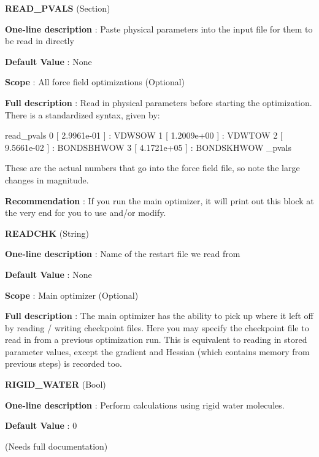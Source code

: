 \begin{DoxyItemize}
\item {\bfseries  \-R\-E\-A\-D\-\_\-\-P\-V\-A\-L\-S } (\-Section) \par
{\bfseries  \-One-\/line description }\-: \-Paste physical parameters into the input file for them to be read in directly \par
{\bfseries  \-Default \-Value }\-: \-None \par
{\bfseries  \-Scope }\-: \-All force field optimizations (\-Optional) \par
{\bfseries  \-Full description }\-: \-Read in physical parameters before starting the optimization. \-There is a standardized syntax, given by\-: \begin{DoxyVerb}read_pvals
 0 [  2.9961e-01 ] : VDWSOW
 1 [  1.2009e+00 ] : VDWTOW
 2 [  9.5661e-02 ] : BONDSBHWOW
 3 [  4.1721e+05 ] : BONDSKHWOW
 \read_pvals \end{DoxyVerb}
 \-These are the actual numbers that go into the force field file, so note the large changes in magnitude. \par
{\bfseries  \-Recommendation }\-: \-If you run the main optimizer, it will print out this block at the very end for you to use and/or modify.\end{DoxyItemize}
\begin{DoxyItemize}
\item {\bfseries  \-R\-E\-A\-D\-C\-H\-K } (\-String) \par
{\bfseries  \-One-\/line description }\-: \-Name of the restart file we read from \par
{\bfseries  \-Default \-Value }\-: \-None \par
{\bfseries  \-Scope }\-: \-Main optimizer (\-Optional) \par
{\bfseries  \-Full description }\-: \-The main optimizer has the ability to pick up where it left off by reading / writing checkpoint files. \-Here you may specify the checkpoint file to read in from a previous optimization run. \-This is equivalent to reading in stored parameter values, except the gradient and \-Hessian (which contains memory from previous steps) is recorded too.\end{DoxyItemize}
\begin{DoxyItemize}
\item {\bfseries  \-R\-I\-G\-I\-D\-\_\-\-W\-A\-T\-E\-R } (\-Bool) \par
{\bfseries  \-One-\/line description }\-: \-Perform calculations using rigid water molecules. \par
{\bfseries  \-Default \-Value }\-: 0 \par
(\-Needs full documentation)\end{DoxyItemize}

